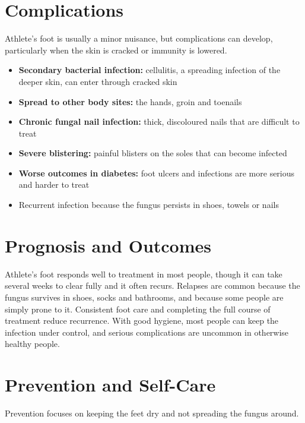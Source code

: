 \section*{Complications}
Athlete's foot is usually a minor nuisance, but complications can develop, particularly when the skin is cracked or immunity is lowered.

\begin{itemize}
    \item \textbf{Secondary bacterial infection:} cellulitis, a spreading infection of the deeper skin, can enter through cracked skin
    \item \textbf{Spread to other body sites:} the hands, groin and toenails
    \item \textbf{Chronic fungal nail infection:} thick, discoloured nails that are difficult to treat
    \item \textbf{Severe blistering:} painful blisters on the soles that can become infected
    \item \textbf{Worse outcomes in diabetes:} foot ulcers and infections are more serious and harder to treat
    \item Recurrent infection because the fungus persists in shoes, towels or nails
\end{itemize}

\section*{Prognosis and Outcomes}
Athlete's foot responds well to treatment in most people, though it can take several weeks to clear fully and it often recurs. Relapses are common because the fungus survives in shoes, socks and bathrooms, and because some people are simply prone to it. Consistent foot care and completing the full course of treatment reduce recurrence. With good hygiene, most people can keep the infection under control, and serious complications are uncommon in otherwise healthy people.

\section*{Prevention and Self-Care}
Prevention focuses on keeping the feet dry and not spreading the fungus around.

